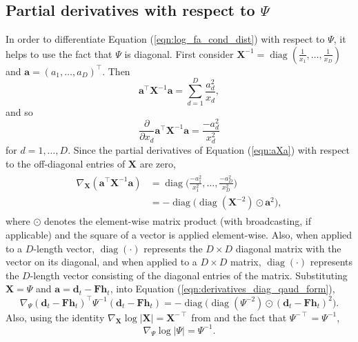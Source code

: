 \documentclass[msc,deptreport.inf]{infthesis} %
\newcommand{\matr}[1]{\mathbf{#1}}
\newcommand{\diag}{\mathop{\mathrm{diag}}}
\begin{document}
\subsection{Partial derivatives with respect to $\Psi$}

In order to differentiate Equation (\ref{eqn:log_fa_cond_dist}) with respect to $\Psi$, it helps to use the fact that $\Psi$ is diagonal. First consider $\matr{X}^{-1} = \diag(\frac{1}{x_1}, \dots, \frac{1}{x_D})$ and $\matr{a} = (a_1, \dots, a_D)^\intercal$. Then 
\begin{equation}\label{eqn:aXa}
	\matr{a}^\intercal \matr{X}^{-1} \matr{a} = \sum_{d=1}^D \frac{a_d^2}{x_d},
\end{equation}
and so
\begin{equation}
	\frac{\partial}{\partial x_d} \matr{a}^\intercal \matr{X}^{-1} \matr{a} = \frac{-a_d^2}{x_d^2}
\end{equation}
for $d=1, \dots, D$. Since the partial derivatives of Equation (\ref{eqn:aXa}) with respect to the off-diagonal entries of $\matr{X}$ are zero, 
\begin{align}\label{eqn:derivatives_diag_qaud_form}
\begin{split}
	\nabla_\matr{X} (\matr{a}^\intercal \matr{X}^{-1} \matr{a}) 
	& = \diag\Big({\frac{-a_1^2}{x_1^2}, \dots, \frac{-a_D^2}{x_D^2}}\Big) \\
	& = -\diag\big(\diag(\matr{X}^{-2}) \odot \matr{a}^2\big),
\end{split}
\end{align}  
where $\odot$ denotes the element-wise matrix product (with broadcasting, if applicable) and the square of a vector is applied element-wise. Also, when applied to a $D$-length vector, $\diag(\cdot)$ represents the $D \times D$ diagonal matrix with the vector on its diagonal, and when applied to a $D \times D$ matrix, $\diag(\cdot)$ represents the $D$-length vector consisting of the diagonal entries of the matrix. Substituting $\matr{X} = \Psi$ and $\matr{a} = \matr{d}_t - \matr{Fh}_t$, into Equation (\ref{eqn:derivatives_diag_qaud_form}),
\begin{equation}\label{eqn:derivatives_wrt_Psi_1}
	\nabla_\Psi (\matr{d}_t - \matr{Fh}_t)^\intercal \Psi^{-1} (\matr{d}_t - \matr{Fh}_t) 
	= -\diag\big(\diag(\Psi^{-2}) \odot (\matr{d}_t - \matr{Fh}_t)^2\big).
\end{equation}
Also, using the identity $\nabla_\matr{X} \log |\matr{X}| = \matr{X}^{-\intercal}$ from \cite{petersen2012} and the fact that $\Psi^{-\intercal} = \Psi^{-1}$, 
\begin{equation}\label{eqn:derivatives_wrt_Psi_2}
	\nabla_\Psi \log |\Psi|
	= \Psi^{-1}.
\end{equation}
\end{document}
